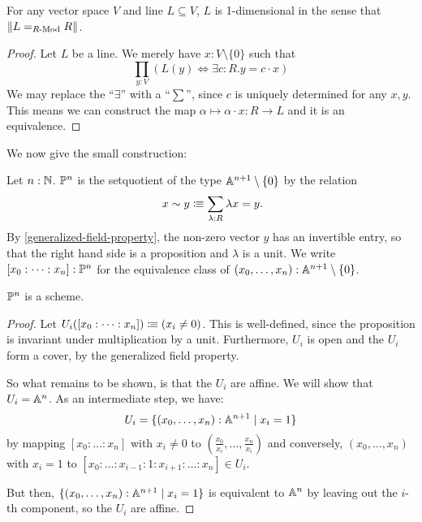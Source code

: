 \begin{proposition}%
  \label{lines-are-one-dimensional}
  For any vector space $V$ and line $L\subseteq V$,
  $L$ is 1-dimensional in the sense that $\lVert L=_{R\text{-}\mathrm{Mod}}R \rVert$.
\end{proposition}

\begin{proof}
  Let $L$ be a line.
  We merely have $x:V\setminus\{0\}$ such that 
  \[ \prod_{y:V}\left(L (y) \Leftrightarrow \exists c:R.y=c\cdot x\right)\]
  We may replace the ``$\exists$'' with a ``$\sum$'',
  since $c$ is uniquely determined for any $x,y$.
  This means we can construct the map $\alpha\mapsto \alpha\cdot x:R\to L$ and it is an equivalence.
\end{proof}

We now give the small construction:

\begin{definition}%
  \label{projective-space-hit}
  Let $n:\mathbb{N}$.
   $\mathbb{P}^n$ is the setquotient of the type $\mathbb{A}^{n+1}\setminus\{0\}$ by the relation
  \[
    x \sim y \colonequiv \sum_{\lambda : R} \lambda x=y\rlap{.}
  \]
  By \cref{generalized-field-property}, the non-zero vector $y$ has an invertible entry,
  so that the right hand side is a proposition and $\lambda$ is a unit.
  We write $[x_0:\dots:x_n]:\mathbb{P}^n$ for the equivalence class of $(x_0,\dots,x_n):\mathbb{A}^{n+1}\setminus\{0\}$.
\end{definition}

\begin{theorem}
  $\mathbb{P}^n$ is a scheme.
\end{theorem}

\begin{proof}
  Let $U_i([x_0:\dots:x_n])\vcentcolon\mspace{-1.2mu}\equiv (x_i\neq 0)$.
  This is well-defined, since the proposition is invariant under multiplication by a unit.
  Furthermore, $U_i$ is open and the $U_i$ form a cover, by the generalized field property.

  So what remains to be shown, is that the $U_i$ are affine.
  We will show that $U_i=\mathbb{A}^n$.
  As an intermediate step, we have:
  \[
    U_i=\{(x_0,\dots,x_n):\mathbb{A}^{n+1}\mid x_i=1\}
  \]
  by mapping $[x_0:\dots:x_n]$ with $x_i\neq 0$
  to $\left(\frac{x_0}{x_i},\dots,\frac{x_n}{x_i}\right)$
  and conversely, $(x_0,\dots,x_n)$ with $x_i=1$ to $[x_0:\dots:x_{i-1}:1:x_{i+1}:\dots:x_n]\in U_i$.

  But then, $\{(x_0,\dots,x_n):\mathbb{A}^{n+1}\mid x_i=1\}$
  is equivalent to $\mathbb{A}^n$ by leaving out the $i$-th component,
  so the $U_i$ are affine.
\end{proof}

